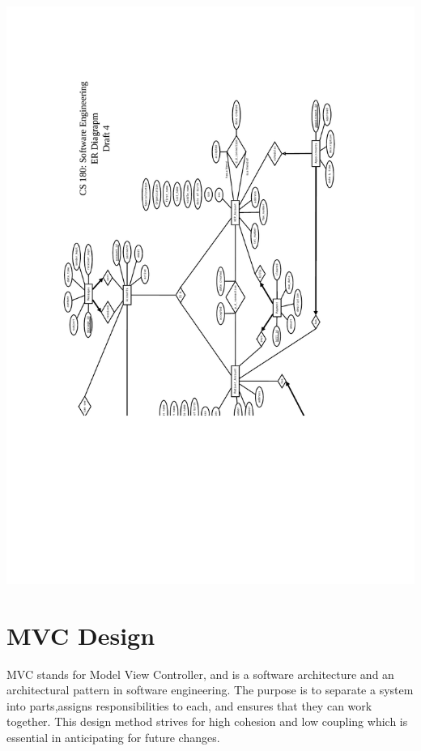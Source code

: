 \documentclass[12pt]{report}
\begin{document}
\includegraphics[scale=0.6,angle=180]{cs180_ER_draft4.pdf}

\chapter{MVC Design}

MVC stands for Model View Controller, and is a software architecture and an architectural pattern in software engineering. The purpose is to separate a system into parts,assigns responsibilities to each, and ensures that they can work together. This design method strives for high cohesion and low coupling which is essential in anticipating for future changes.
\end{document}
